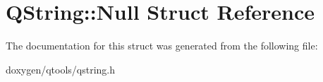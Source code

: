 \hypertarget{struct_q_string_1_1_null}{}\section{Q\+String\+::Null Struct Reference}
\label{struct_q_string_1_1_null}


The documentation for this struct was generated from the following file\+:\begin{DoxyCompactItemize}
\item 
doxygen/qtools/qstring.\+h\end{DoxyCompactItemize}
